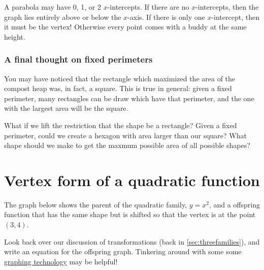 A parabola may have 0, 1, or 2 $x$-intercepts. If there are no $x$-intercepts, then the graph lies entirely above or below the $x$-axis. If there is only one $x$-intercept, then it must be the vertex! Otherwise every point comes with a buddy at the same height.


\subsubsection{A final thought on fixed perimeters}

You may have noticed that the rectangle which maximized the area of the compost heap was, in fact, a square. This is true in general: given a fixed perimeter, many rectangles can be draw which have that perimeter, and the one with the largest area will be the square.

What if we lift the restriction that the shape be a rectangle? Given a fixed perimeter, could we create a hexagon with area larger than our square? What shape should we make to get the maxmum possible area of all possible shapes?


\section{Vertex form of a quadratic function}
\label{sec:vertexform}

\begin{boxexplore}
The graph below shows the parent of the quadratic family, $y=x^2$, and a offspring function that has the same shape but is shifted so that the vertex is at the point $(3, 4)$.

\begin{center}
\end{center}

Look back over our discussion of transformations (back in \cref{sec:threefamilies}), and write an equation for the offspring graph. Tinkering around with some some \href{https://www.desmos.com/}{graphing technology} may be helpful!
\end{boxexplore}

